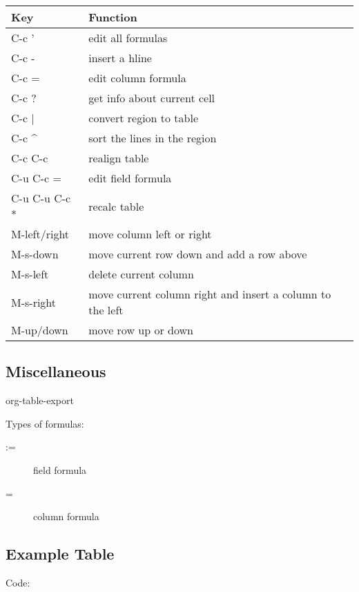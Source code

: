 \documentclass[11pt]{article}
\begin{document}
\begin{center}
\begin{tabular}{ll}
Key & Function\\
\hline
C-c ' & edit all formulas\\
C-c - & insert a hline\\
C-c = & edit column formula\\
C-c ? & get info about current cell\\
C-c $\vert{}$ & convert region to table\\
C-c \^{} & sort the lines in the region\\
C-c C-c & realign table\\
C-u C-c = & edit field formula\\
C-u C-u C-c * & recalc table\\
M-left/right & move column left or right\\
M-s-down & move current row down and add a row above\\
M-s-left & delete current column\\
M-s-right & move current column right and insert a column to the left\\
M-up/down & move row up or down\\
\end{tabular}
\end{center}

\subsection{Miscellaneous}
\label{sec-3-2}
\begin{description}
\item[{M-x}] org-table-export
\item Types of formulas:
\begin{description}
\item[{:=}] field formula
\item[{=}] column formula
\end{description}
\end{description}



\subsection{Example Table}
\label{sec-3-3}

Code:
\end{document}
